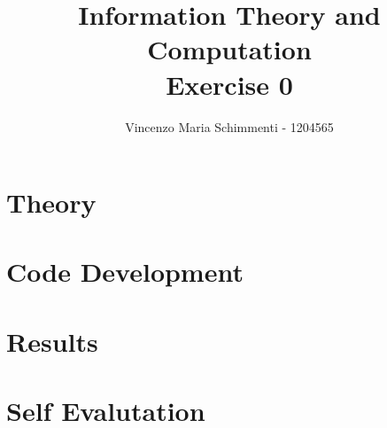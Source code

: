 \documentclass{article}
\title{%
	Information Theory and Computation \\
	Exercise  0}
\author{Vincenzo Maria Schimmenti - 1204565}
\begin{document}
\maketitle
 
\section*{Theory}
\section*{Code Development}
\section*{Results}
\section*{Self Evalutation}
 
\end{document}
